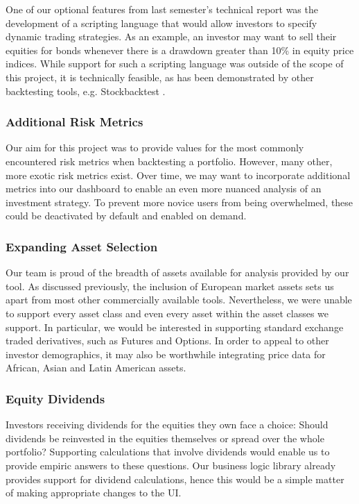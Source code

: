 \documentclass[main.tex]{subfiles}
\begin{document}
One of our optional features from last semester's technical report was the development of a scripting language that would allow investors to specify dynamic trading strategies. As an example, an investor may want to sell their equities for bonds whenever there is a drawdown greater than 10\% in equity price indices. While support for such a scripting language was outside of the scope of this project, it is technically feasible, as has been demonstrated by other backtesting tools, e.g. Stockbacktest \cite{stockbacktest}.

\subsubsection{Additional Risk Metrics}

Our aim for this project was to provide values for the most commonly encountered risk metrics when backtesting a portfolio. However, many other, more exotic risk metrics exist. Over time, we may want to incorporate additional metrics into our dashboard to enable an even more nuanced analysis of an investment strategy. To prevent more novice users from being overwhelmed, these could be deactivated by default and enabled on demand.

\subsubsection{Expanding Asset Selection}

Our team is proud of the breadth of assets available for analysis provided by our tool. As discussed previously, the inclusion of European market assets sets us apart from most other commercially available tools. Nevertheless, we were unable to support every asset class and even every asset within the asset classes we support. In particular, we would be interested in supporting standard exchange traded derivatives, such as Futures and Options. In order to appeal to other investor demographics, it may also be worthwhile integrating price data for African, Asian and Latin American assets.

\subsubsection{Equity Dividends}

Investors receiving dividends for the equities they own face a choice: Should dividends be reinvested in the equities themselves or spread over the whole portfolio? Supporting calculations that involve dividends would enable us to provide empiric answers to these questions. Our business logic library already provides support for dividend calculations, hence this would be a simple matter of making appropriate changes to the UI.
\end{document}
